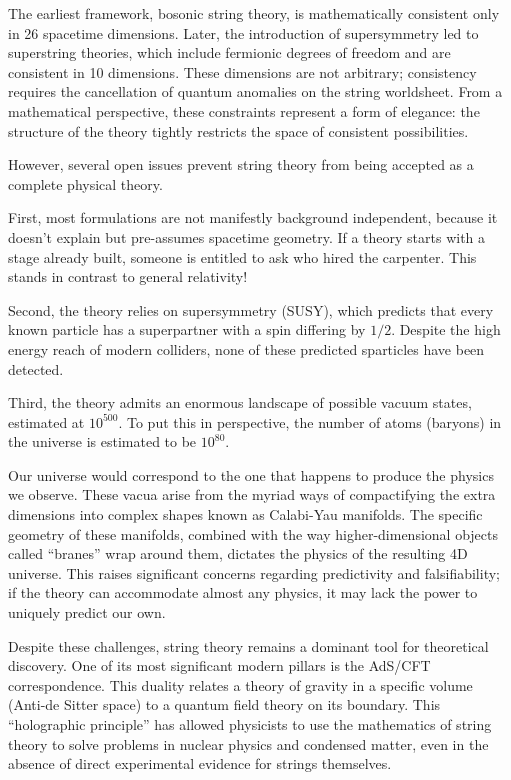 The earliest framework, bosonic string theory, is mathematically consistent only in 26 spacetime dimensions.
Later, the introduction of supersymmetry led to superstring theories, which include fermionic degrees of freedom and are consistent in 10 dimensions.
These dimensions are not arbitrary; consistency requires the cancellation of quantum anomalies on the string worldsheet.
From a mathematical perspective, these constraints represent a form of elegance: the structure of the theory tightly restricts the space of consistent possibilities.

However, several open issues prevent string theory from being accepted as a complete physical theory.

First, most formulations are not manifestly background independent, because it doesn't explain but pre-assumes spacetime geometry.
If a theory starts with a stage already built, someone is entitled to ask who hired the carpenter.
This stands in contrast to general relativity!

Second, the theory relies on supersymmetry (SUSY), which predicts that every known particle has a superpartner with a spin differing by $1/2$.
Despite the high energy reach of modern colliders, none of these predicted sparticles have been detected.

Third, the theory admits an enormous landscape of possible vacuum states, estimated at $10^{500}$. To put this in perspective, the number of atoms (baryons) in the universe
is estimated to be $10^{80}$.

Our universe would correspond to the one that happens to produce the physics we observe.
These vacua arise from the myriad ways of compactifying the extra dimensions into complex shapes known as Calabi-Yau manifolds.
The specific geometry of these manifolds, combined with the way higher-dimensional objects called ``branes'' wrap around them, dictates the physics of the resulting 4D universe.
This raises significant concerns regarding predictivity and falsifiability; if the theory can accommodate almost any physics, it may lack the power to uniquely predict our own.

Despite these challenges, string theory remains a dominant tool for theoretical discovery.
One of its most significant modern pillars is the AdS/CFT correspondence.
This duality relates a theory of gravity in a specific volume (Anti-de Sitter space) to a quantum field theory on its boundary.
This ``holographic principle'' has allowed physicists to use the mathematics of string theory to solve problems in nuclear physics and condensed matter,
even in the absence of direct experimental evidence for strings themselves.

